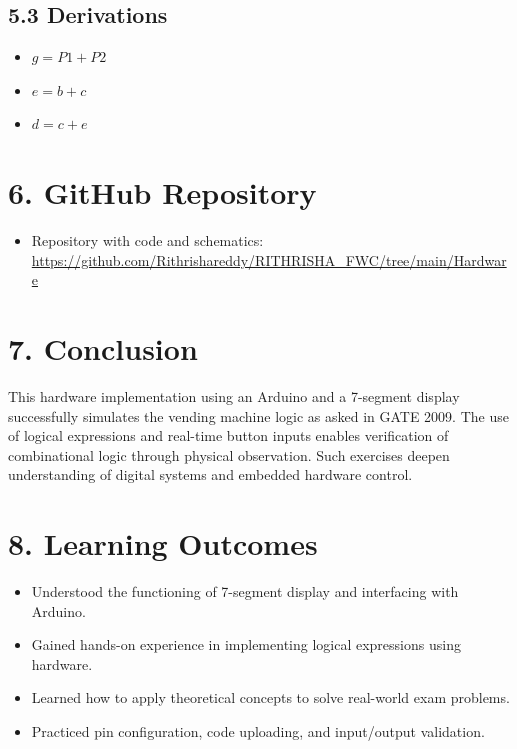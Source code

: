 \documentclass[12pt]{article}
\begin{document}
\subsection*{5.3 Derivations}
\begin{itemize}
    \item $g = P1 + P2$
    \item $e = b + c$
    \item $d = c + e$
\end{itemize}

\vspace{1em}
\section*{6. GitHub Repository}
\begin{itemize}
    \item Repository with code and schematics: \\
    \url{https://github.com/Rithrishareddy/RITHRISHA_FWC/tree/main/Hardware}
\end{itemize}

\vspace{1em}
\section*{7. Conclusion}
This hardware implementation using an Arduino and a 7-segment display successfully simulates the vending machine logic as asked in GATE 2009. The use of logical expressions and real-time button inputs enables verification of combinational logic through physical observation. Such exercises deepen understanding of digital systems and embedded hardware control.

\vspace{1em}
\section*{8. Learning Outcomes}
\begin{itemize}
    \item Understood the functioning of 7-segment display and interfacing with Arduino.
    \item Gained hands-on experience in implementing logical expressions using hardware.
    \item Learned how to apply theoretical concepts to solve real-world exam problems.
    \item Practiced pin configuration, code uploading, and input/output validation.
\end{itemize}
\end{document}
